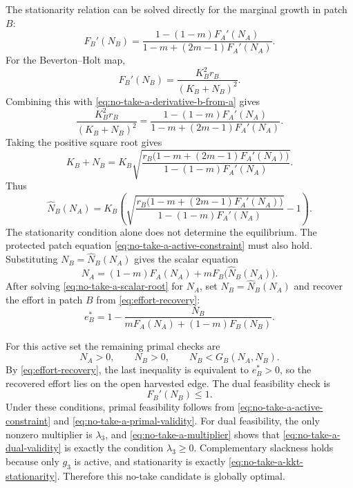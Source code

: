 \documentclass{article}
\numberwithin{equation}{section}
\begin{document}
The stationarity relation can be solved directly for the marginal growth
in patch $B$:
\begin{equation}
    \label{eq:no-take-a-derivative-b-from-a}
    F_B'(N_B)
    =
    \frac{1-(1-m)F_A'(N_A)}
         {1-m+(2m-1)F_A'(N_A)}.
\end{equation}
For the Beverton--Holt map,
\begin{equation*}
    F_B'(N_B)=\frac{K_B^2r_B}{(K_B+N_B)^2}.
\end{equation*}
Combining this with \eqref{eq:no-take-a-derivative-b-from-a} gives
\begin{equation*}
    \frac{K_B^2r_B}{(K_B+N_B)^2}
    =
    \frac{1-(1-m)F_A'(N_A)}
         {1-m+(2m-1)F_A'(N_A)}.
\end{equation*}
Taking the positive square root gives
\begin{equation*}
    K_B+N_B
    =
    K_B
    \sqrt{
        \frac{
        r_B\bigl(1-m+(2m-1)F_A'(N_A)\bigr)}
        {1-(1-m)F_A'(N_A)}
    }.
\end{equation*}
Thus
\begin{equation}
    \label{eq:no-take-a-nb-from-na}
    \widehat N_B(N_A)
    =
    K_B\left(
    \sqrt{
        \frac{
        r_B\bigl(1-m+(2m-1)F_A'(N_A)\bigr)}
        {1-(1-m)F_A'(N_A)}
    }
    -1\right).
\end{equation}
The stationarity condition alone does not determine the equilibrium. The
protected patch equation \eqref{eq:no-take-a-active-constraint} must
also hold. Substituting $N_B=\widehat N_B(N_A)$ gives the scalar equation
\begin{equation}
    \label{eq:no-take-a-scalar-root}
    N_A
    =
    (1-m)F_A(N_A)+mF_B\bigl(\widehat N_B(N_A)\bigr).
\end{equation}
After solving \eqref{eq:no-take-a-scalar-root} for $N_A$, set
$N_B=\widehat N_B(N_A)$ and recover the effort in patch $B$ from
\eqref{eq:effort-recovery}:
\begin{equation}
    \label{eq:no-take-a-effort-recovery}
    e_B^*
    =
    1-
    \frac{N_B}
         {mF_A(N_A)+(1-m)F_B(N_B)}.
\end{equation}

For this active set the remaining primal checks are
\begin{equation}
    \label{eq:no-take-a-primal-validity}
    N_A>0,\qquad N_B>0,\qquad N_B<G_B(N_A,N_B).
\end{equation}
By \eqref{eq:effort-recovery}, the last inequality is equivalent to
$e_B^*>0$, so the recovered effort lies on the open harvested edge. The
dual feasibility check is
\begin{equation}
    \label{eq:no-take-a-dual-validity}
    F_B'(N_B)\leq1.
\end{equation}
Under these conditions, primal feasibility follows from
\eqref{eq:no-take-a-active-constraint} and
\eqref{eq:no-take-a-primal-validity}. For dual feasibility, the
only nonzero multiplier is $\lambda_3$, and
\eqref{eq:no-take-a-multiplier} shows that
\eqref{eq:no-take-a-dual-validity} is exactly the condition
$\lambda_3\geq0$.
Complementary slackness holds because only $g_3$ is active, and
stationarity is exactly
\eqref{eq:no-take-a-kkt-stationarity}. Therefore this no-take
candidate is globally optimal.
\end{document}
